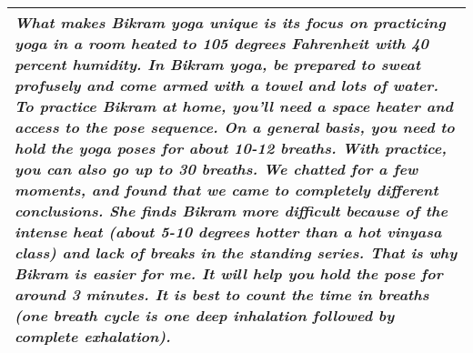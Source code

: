 \documentclass{standalone}
\begin{document}
\begin{tabularx}{18cm}{X}
    \toprule
    \emph{What makes Bikram yoga unique is its focus on practicing yoga in a room heated to 105 degrees Fahrenheit with 40 percent humidity. In Bikram yoga, be prepared to sweat profusely and come armed with a towel and lots of water. To practice Bikram at home, you'll need a space heater and access to the pose sequence. On a general basis, you need to hold the yoga poses for about 10-12 breaths. With practice, you can also go up to 30 breaths. We chatted for a few moments, and found that we came to completely different conclusions. She finds Bikram more difficult because of the intense heat (about 5-10 degrees hotter than a hot vinyasa class) and lack of breaks in the standing series. That is why Bikram is easier for me. It will help you hold the pose for around 3 minutes. It is best to count the time in breaths (one breath cycle is one deep inhalation followed by complete exhalation).} \\
    \bottomrule
\end{tabularx}
\end{document}
